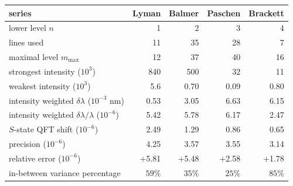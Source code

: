 \documentclass[twoside]{article}
\numberwithin{equation}{section}
\begin{document}
\begin{table}
\centering
\begin{tabular}{|l|r|r|r|r|}
\hline
series & Lyman & Balmer & Paschen & Brackett \\
\hline
lower level $n$ & 1 & 2 & 3 & 4 \\
lines used & 11 & 35 & 28 & 7 \\
maximal level $m_{\max}$ & 12 & 37 & 40 & 16 \\
strongest intensity ($10^3$) & 840 & 500 & 32 & 11 \\
weakest intensity ($10^3$) & 5.6 & 0.70 & 0.09 & 0.80 \\
intensity weighted $\delta\lambda$ ($10^{-3}$ nm) & 0.53 & 3.05 & 6.63 & 6.15 \\
intensity weighted $\delta\lambda/\lambda$ ($10^{-6}$) & 5.42 & 5.78 & 6.17 & 2.47 \\
$S$-state QFT shift ($10^{-6}$) & 2.49 & 1.29 & 0.86 & 0.65 \\
\hline
precision ($10^{-6}$) & 4.25 & 3.57 & 3.55 & 3.14 \\
relative error ($10^{-6}$) & +5.81 & +5.48 & +2.58 & +1.78 \\
in-between variance percentage & $59\%$ & $35\%$ & $25\%$ & $85\%$ \\
\hline
\end{tabular}
\label{tbl: hydrogen spectra}
\end{table}
\end{document}
